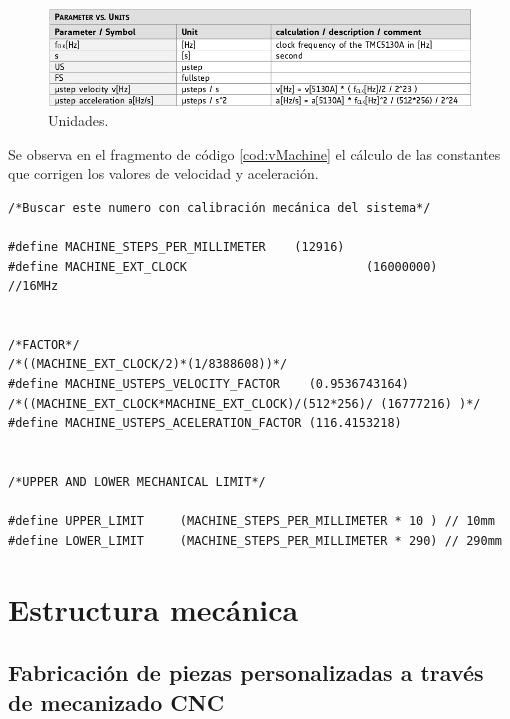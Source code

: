 \begin{figure}[h!]
	\centering
	\includegraphics[width=1\textwidth]{./Figures/unit.png}
	\caption{Unidades.}
	\label{fig:unidades}
\end{figure}

Se observa en el fragmento de código \ref{cod:vMachine} el cálculo de las constantes que corrigen los valores de velocidad y aceleración.

 
 

\begin{lstlisting}[label=cod:vMachine,caption=Macros de desplazamiento y factores de corrección.]  % Start your code-block
/*Buscar este numero con calibración mecánica del sistema*/

#define MACHINE_STEPS_PER_MILLIMETER	(12916)		
#define MACHINE_EXT_CLOCK						  (16000000)	//16MHz


/*FACTOR*/
/*((MACHINE_EXT_CLOCK/2)*(1/8388608))*/	
#define MACHINE_USTEPS_VELOCITY_FACTOR	  (0.9536743164)
/*((MACHINE_EXT_CLOCK*MACHINE_EXT_CLOCK)/(512*256)/ (16777216) )*/
#define MACHINE_USTEPS_ACELERATION_FACTOR (116.4153218)


/*UPPER AND LOWER MECHANICAL LIMIT*/

#define UPPER_LIMIT 	(MACHINE_STEPS_PER_MILLIMETER * 10 ) // 10mm
#define LOWER_LIMIT		(MACHINE_STEPS_PER_MILLIMETER * 290) // 290mm

\end{lstlisting}







\section{Estructura mecánica}
\subsection{Fabricación de piezas personalizadas a través de mecanizado CNC}


